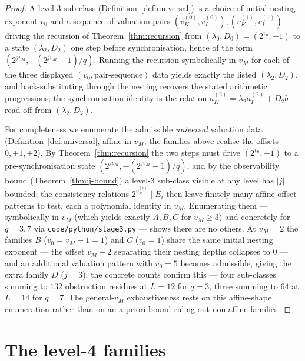 \documentclass[11pt,reqno]{amsart}
\theoremstyle{plain}
\theoremstyle{definition}
\theoremstyle{remark}
\newcommand{\vk}{v_{K}}
\newcommand{\vi}{v_{I}}
\newcommand{\aK}{a_{K}}
\newcommand{\aI}{a_{I}}
\newcommand{\vM}{v_{M}}
\newcommand{\srcpath}[1]{\nolinkurl{#1}}
\begin{document}
\begin{proof}
A level-$3$ sub-class (Definition~\ref{def:universal}) is a choice of initial
nesting exponent $v_0$ and a sequence of valuation pairs
$(\vk^{(0)}, \vi^{(0)}), (\vk^{(1)}, \vi^{(1)})$
driving the recursion of Theorem~\ref{thm:recursion} from $(\lambda_0, D_0) =
(2^{v_0}, -1)$ to a state $(\lambda_2, D_2)$ one step before
synchronisation, hence of the form $(2^{j\vM}, -(2^{j\vM} - 1)/q)$. Running
the recursion symbolically in $\vM$ for each of the three displayed
$(v_0, \text{pair-sequence})$ data yields exactly the listed $(\lambda_2,
D_2)$, and back-substituting through the nesting recovers the stated
arithmetic progressions; the synchronisation identity is the relation
$\aK^{(2)} = \lambda_2 \aI^{(2)} + D_2 b$ read off from $(\lambda_2, D_2)$.

For completeness we enumerate the admissible \emph{universal} valuation data
(Definition~\ref{def:universal}, affine in $\vM$; the families above realise
the offsets $0, \pm 1, \pm 2$). By
Theorem~\ref{thm:recursion} the two steps must drive $(2^{v_0}, -1)$ to a
pre-synchronisation state $(2^{j\vM}, -(2^{j\vM}-1)/q)$, and by the
observability bound (Theorem~\ref{thm:j-bound}) a level-$3$ sub-class visible
at any level has $\lvert j\rvert$ bounded; the consistency relations
$2^{\vk^{(i)}} \mid E_i$ then leave finitely many affine offset patterns to
test, each a polynomial identity in $\vM$. Enumerating them --- symbolically
in $\vM$ (which yields exactly $A, B, C$ for $\vM \ge 3$) and concretely for
$q = 3, 7$ via \srcpath{code/python/stage3.py} --- shows there are no others. At
$\vM = 2$ the families $B$ ($v_0 = \vM - 1 = 1$) and $C$ ($v_0 = 1$) share the
same initial nesting exponent --- the offset $\vM - 2$ separating their
nesting depths collapses to $0$ --- and an additional valuation pattern with
$v_0 = 5$ becomes admissible, giving the extra family $D$ ($j = 3$);
the concrete counts confirm this --- four sub-classes summing to $132$
obstruction residues at $L = 12$ for $q = 3$, three summing to $64$ at
$L = 14$ for $q = 7$.
The general-$\vM$ exhaustiveness rests on this affine-shape enumeration
rather than on an a-priori bound ruling out non-affine families.
\end{proof}

\section{The level-4 families}\label{sec:stage4}
\end{document}
